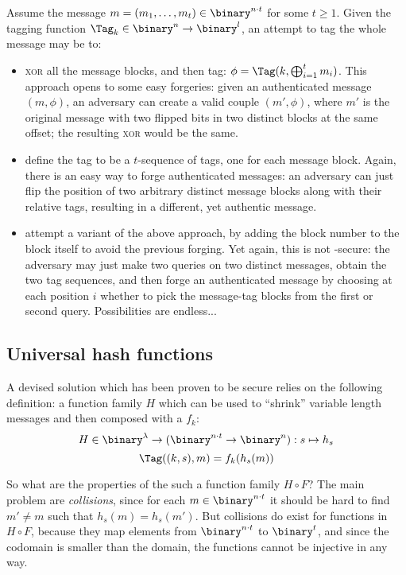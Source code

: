 Assume the message $m = (m_1, \dots, m_t) \in \binary^{n \cdot t}$ for some $t \geq 1$. Given the tagging function $\Tag_k \in \binary^n \to \binary^l$, an attempt to tag the whole message may be to:

\begin{itemize}    
    \item \textsc{xor} all the message blocks, and then tag: $\phi = \Tag(k, \bigoplus_{i = 1}^{t} m_i)$. This approach opens to some easy forgeries: given an authenticated message $(m, \phi)$, an adversary can create a valid couple $(m', \phi)$, where $m'$ is the original message with two flipped bits in two distinct blocks at the same offset; the resulting \textsc{xor} would be the same.

    \item define the tag to be a $t$-sequence of tags, one for each message block. Again, there is an easy way to forge authenticated messages: an adversary can just flip the position of two arbitrary distinct message blocks along with their relative tags, resulting in a different, yet authentic message.

    \item attempt a variant of the above approach, by adding the block number to the block itself to avoid the previous forging. Yet again, this is not \ufcma-secure: the adversary may just make two queries on two distinct messages, obtain the two tag sequences, and then forge an authenticated message by choosing at each position $i$ whether to pick the message-tag blocks from the first or second query. Possibilities are endless...

\end{itemize}

\subsection{Universal hash functions}

A devised solution which has been proven to be secure relies on the following definition: a function family $H$ which can be used to ``shrink'' variable length messages and then composed with a \prf{} $f_k$:
\[
   H \in \binary^\lambda \to (\binary^{n \cdot t} \to \binary^n) : s \mapsto h_s
\]
\[
    \Tag((k, s), m) = f_k(h_s(m))
\]

So what are the properties of the such a function family $H \circ F$? The main problem are \emph{collisions}, since for each $m \in \binary^{n \cdot t}$ it should be hard to find $m' \neq m$ such that $h_s(m) = h_s(m')$. But collisions do exist for functions in $H \circ F$, because they map elements from $\binary^{n \cdot t} $ to $\binary^t$, and since the codomain is smaller than the domain, the functions cannot be injective in any way.

